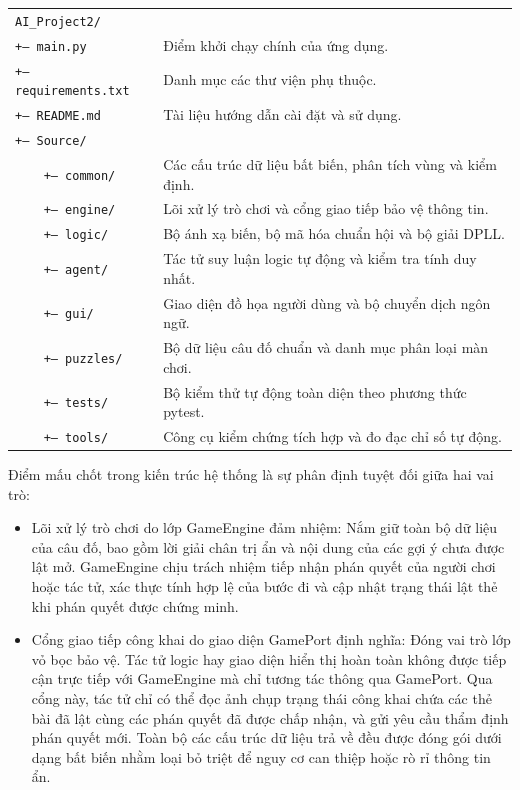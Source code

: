 \begin{center}
\small
\renewcommand{\arraystretch}{1.2}
\begin{tabularx}{\textwidth}{@{}l X@{}}
\texttt{AI\_Project2/} & \\
\texttt{+-- main.py} & Điểm khởi chạy chính của ứng dụng. \\
\texttt{+-- requirements.txt} & Danh mục các thư viện phụ thuộc. \\
\texttt{+-- README.md} & Tài liệu hướng dẫn cài đặt và sử dụng. \\
\texttt{+-- Source/} & \\
\texttt{~~~~+-- common/} & Các cấu trúc dữ liệu bất biến, phân tích vùng và kiểm định. \\
\texttt{~~~~+-- engine/} & Lõi xử lý trò chơi và cổng giao tiếp bảo vệ thông tin. \\
\texttt{~~~~+-- logic/} & Bộ ánh xạ biến, bộ mã hóa chuẩn hội và bộ giải DPLL. \\
\texttt{~~~~+-- agent/} & Tác tử suy luận logic tự động và kiểm tra tính duy nhất. \\
\texttt{~~~~+-- gui/} & Giao diện đồ họa người dùng và bộ chuyển dịch ngôn ngữ. \\
\texttt{~~~~+-- puzzles/} & Bộ dữ liệu câu đố chuẩn và danh mục phân loại màn chơi. \\
\texttt{~~~~+-- tests/} & Bộ kiểm thử tự động toàn diện theo phương thức pytest. \\
\texttt{~~~~+-- tools/} & Công cụ kiểm chứng tích hợp và đo đạc chỉ số tự động. \\
\end{tabularx}
\end{center}

Điểm mấu chốt trong kiến trúc hệ thống là sự phân định tuyệt đối giữa hai vai trò:
\begin{itemize}
    \item Lõi xử lý trò chơi do lớp GameEngine đảm nhiệm: Nắm giữ toàn bộ dữ liệu của câu đố, bao gồm lời giải chân trị ẩn và nội dung của các gợi ý chưa được lật mở. GameEngine chịu trách nhiệm tiếp nhận phán quyết của người chơi hoặc tác tử, xác thực tính hợp lệ của bước đi và cập nhật trạng thái lật thẻ khi phán quyết được chứng minh.
    \item Cổng giao tiếp công khai do giao diện GamePort định nghĩa: Đóng vai trò lớp vỏ bọc bảo vệ. Tác tử logic hay giao diện hiển thị hoàn toàn không được tiếp cận trực tiếp với GameEngine mà chỉ tương tác thông qua GamePort. Qua cổng này, tác tử chỉ có thể đọc ảnh chụp trạng thái công khai chứa các thẻ bài đã lật cùng các phán quyết đã được chấp nhận, và gửi yêu cầu thẩm định phán quyết mới. Toàn bộ các cấu trúc dữ liệu trả về đều được đóng gói dưới dạng bất biến nhằm loại bỏ triệt để nguy cơ can thiệp hoặc rò rỉ thông tin ẩn.
\end{itemize}

